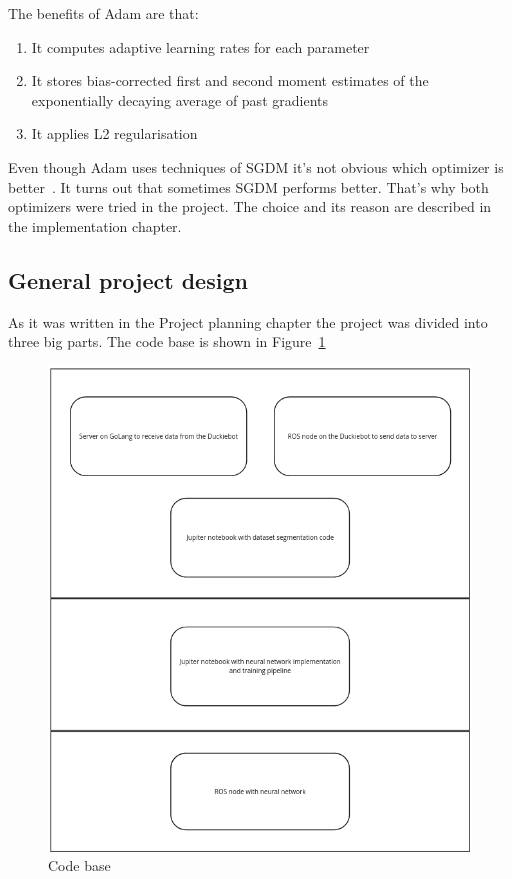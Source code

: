 The benefits of Adam are that:
\begin{enumerate}
    \item It computes adaptive learning rates for each parameter
    \item It stores bias-corrected first and second moment estimates of the exponentially decaying average of past gradients
    \item It applies L2 regularisation
\end{enumerate}

Even though Adam uses techniques of SGDM it's not obvious which optimizer is better~\cite{adam_vs_sgd}. It turns out that sometimes SGDM performs better.
That's why both optimizers were tried in the project. The choice and its reason are described in the implementation chapter.

\subsection{General project design}
As it was written in the Project planning chapter the project was divided into three big parts. The code base is shown in Figure~\ref{code_base}
\begin{figure}[h]
    \begin{center}
    \includegraphics[scale=0.35]{src/Design/assets/code_base.png}
    \end{center}
    \caption{Code base}\label{code_base}
\end{figure}
